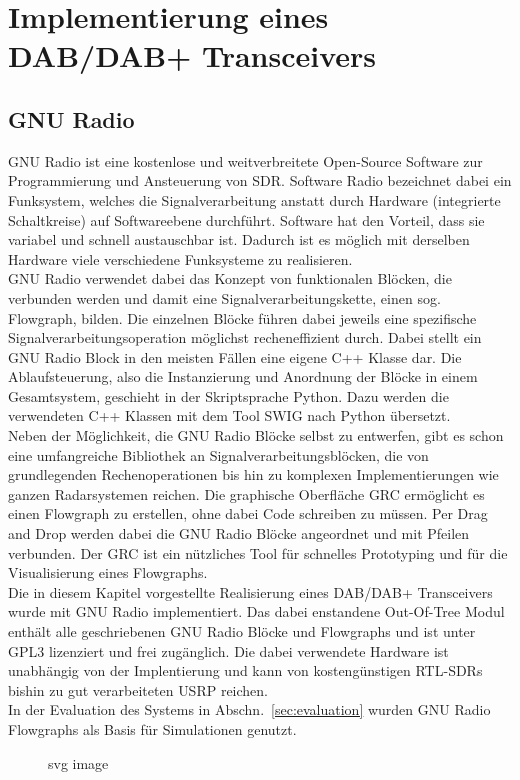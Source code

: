 \chapter{Implementierung eines DAB/DAB+ Transceivers}
\section{GNU Radio}
GNU Radio ist eine kostenlose und weitverbreitete Open-Source Software zur Programmierung und Ansteuerung von \ac{SDR}. Software Radio bezeichnet dabei ein Funksystem, welches die Signalverarbeitung anstatt durch Hardware (integrierte Schaltkreise) auf Softwareebene durchführt. Software hat den Vorteil, dass sie variabel und schnell austauschbar ist. Dadurch ist es möglich mit derselben Hardware viele verschiedene Funksysteme zu realisieren.\\
GNU Radio verwendet dabei das Konzept von funktionalen Blöcken, die verbunden werden und damit eine Signalverarbeitungskette, einen sog. Flowgraph, bilden. Die einzelnen Blöcke führen dabei jeweils eine spezifische Signalverarbeitungsoperation möglichst recheneffizient durch. Dabei stellt ein GNU Radio Block in den meisten Fällen eine eigene C++ Klasse dar. Die Ablaufsteuerung, also die Instanzierung und Anordnung der Blöcke in einem Gesamtsystem, geschieht in der Skriptsprache Python. Dazu werden die verwendeten C++ Klassen mit dem Tool \ac{SWIG} nach Python übersetzt.\\
Neben der Möglichkeit, die GNU Radio Blöcke selbst zu entwerfen, gibt es schon eine umfangreiche Bibliothek an Signalverarbeitungsblöcken, die von grundlegenden Rechenoperationen bis hin zu komplexen Implementierungen wie ganzen Radarsystemen reichen. Die graphische Oberfläche \ac{GRC} ermöglicht es einen Flowgraph zu erstellen, ohne dabei Code schreiben zu müssen. Per Drag and Drop werden dabei die GNU Radio Blöcke angeordnet und mit Pfeilen verbunden. Der GRC ist ein nützliches Tool für schnelles Prototyping und für die Visualisierung eines Flowgraphs.\\
Die in diesem Kapitel vorgestellte Realisierung eines DAB/DAB+ Transceivers wurde mit GNU Radio implementiert. Das dabei enstandene Out-Of-Tree Modul enthält alle geschriebenen GNU Radio Blöcke und Flowgraphs und ist unter \ac{GPL3} lizenziert und frei zugänglich. Die dabei verwendete Hardware ist unabhängig von der Implentierung und kann von kostengünstigen RTL-SDRs bishin zu gut verarbeiteten \ac{USRP} reichen.\\
In der Evaluation des Systems in Abschn.~\ref{sec:evaluation} wurden GNU Radio Flowgraphs als Basis für Simulationen genutzt.
\begin{figure}[htbp]
  \centering
  
  \caption{svg image}
\end{figure}
